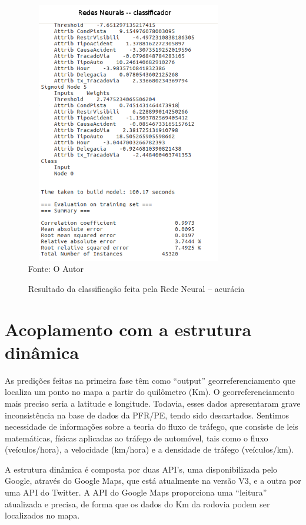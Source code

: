 \begin{figure}
	\centering
	\caption{Resultado da classificação feita pela Rede Neural -- acurácia}
	\includegraphics[width=90mm, height=115mm]{Figuras/Resultados/RNN}\\
	\tiny Fonte: O Autor
	\label{fig:RNN}
\end{figure}


\pagebreak

\section{Acoplamento com a estrutura dinâmica}

As predições feitas na primeira fase têm como ``output'' georreferenciamento que localiza um ponto no mapa a partir do quilômetro (Km). O georreferenciamento mais preciso seria a latitude e longitude. Todavia, esses dados apresentaram grave inconsistência na base de dados da PFR/PE, tendo sido descartados. Sentimos necessidade de informações sobre a teoria do fluxo de tráfego, que consiste de leis matemáticas, físicas aplicadas ao tráfego de automóvel, tais como o fluxo (veículos/hora), a velocidade (km/hora) e a densidade de tráfego (veículos/km).

A estrutura dinâmica é composta por duas API's, uma disponibilizada pelo Google, através do Google Maps, que está atualmente na versão V3, e a
outra por uma API do Twitter. A API do Google Maps proporciona uma ``leitura'' atualizada e precisa, de forma que os dados do Km da rodovia podem ser localizados no mapa.

